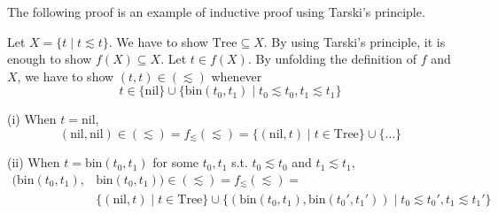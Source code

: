 \documentclass[9pt]{beamer}
\newcommand\Tree[0]{\text{Tree}}
\newcommand\nil[0]{\text{nil}}
\newcommand\bin[0]{\text{bin}}
\begin{document}
\begin{frame}
  The following proof is an example of inductive proof using Tarski's principle.
  \begin{example}
    Let $X = \{t \mid t \lesssim t\}$. We have to show $\Tree \subseteq X$.
    By using Tarski's principle, it is enough to show $f(X) \subseteq X$.
    Let $t \in f(X)$. By unfolding the definition of $f$ and $X$,
    we have to show $(t,t) \in (\lesssim)$ whenever
    $$ t \in \{\nil\} \cup \{\bin(t_0, t_1) \mid t_0 \lesssim t_0, t_1 \lesssim t_1\} $$

    (i) When $t = \nil$,
        $$ (\nil, \nil) \in (\lesssim) = f_\lesssim(\lesssim) = 
           \{(\nil,t) \mid t \in \Tree\} \cup \{ \ldots \}
        $$

    (ii) When $t = \bin(t_0, t_1)$ for some $t_0, t_1$ s.t. $t_0 \lesssim t_0$ and $t_1 \lesssim t_1$,
        $$
          \begin{aligned}
            (\bin(t_0, t_1), & \bin(t_0, t_1)) \in (\lesssim) = f_\lesssim(\lesssim) = \\
            & \{(\nil,t) \mid t \in \Tree\} \cup
              \{(\bin(t_0, t_1), \bin(t_0', t_1')) \mid t_0 \lesssim t_0', t_1 \lesssim t_1' \}
          \end{aligned}
        $$

  \end{example}
\end{frame}
\end{document}
